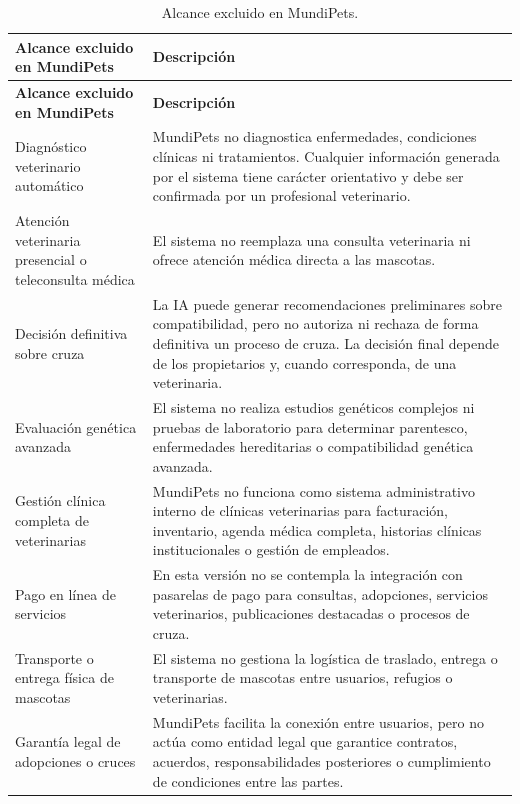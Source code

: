 \documentclass[journal,onecolumn]{IEEEtran}
\begin{document}
	\begin{longtable}{|p{4cm}|p{11cm}|}
		\caption{Alcance excluido en MundiPets.} \label{tab:alcance_excluido} \\
		\hline
		\textbf{Alcance excluido en MundiPets} & \textbf{Descripción} \\
		\hline
		\endfirsthead
		\hline
		\textbf{Alcance excluido en MundiPets} & \textbf{Descripción} \\
		\hline
		\endhead
		\hline
		\endfoot
		\hline
		\endlastfoot
		
		Diagnóstico veterinario automático & MundiPets no diagnostica enfermedades, condiciones clínicas ni tratamientos. Cualquier información generada por el sistema tiene carácter orientativo y debe ser confirmada por un profesional veterinario. \\
		\hline
		Atención veterinaria presencial o teleconsulta médica & El sistema no reemplaza una consulta veterinaria ni ofrece atención médica directa a las mascotas. \\
		\hline
		Decisión definitiva sobre cruza & La IA puede generar recomendaciones preliminares sobre compatibilidad, pero no autoriza ni rechaza de forma definitiva un proceso de cruza. La decisión final depende de los propietarios y, cuando corresponda, de una veterinaria. \\
		\hline
		Evaluación genética avanzada & El sistema no realiza estudios genéticos complejos ni pruebas de laboratorio para determinar parentesco, enfermedades hereditarias o compatibilidad genética avanzada. \\
		\hline
		Gestión clínica completa de veterinarias & MundiPets no funciona como sistema administrativo interno de clínicas veterinarias para facturación, inventario, agenda médica completa, historias clínicas institucionales o gestión de empleados. \\
		\hline
		Pago en línea de servicios & En esta versión no se contempla la integración con pasarelas de pago para consultas, adopciones, servicios veterinarios, publicaciones destacadas o procesos de cruza. \\
		\hline
		Transporte o entrega física de mascotas & El sistema no gestiona la logística de traslado, entrega o transporte de mascotas entre usuarios, refugios o veterinarias. \\
		\hline
		Garantía legal de adopciones o cruces & MundiPets facilita la conexión entre usuarios, pero no actúa como entidad legal que garantice contratos, acuerdos, responsabilidades posteriores o cumplimiento de condiciones entre las partes. \\

\end{longtable}
\end{document}

